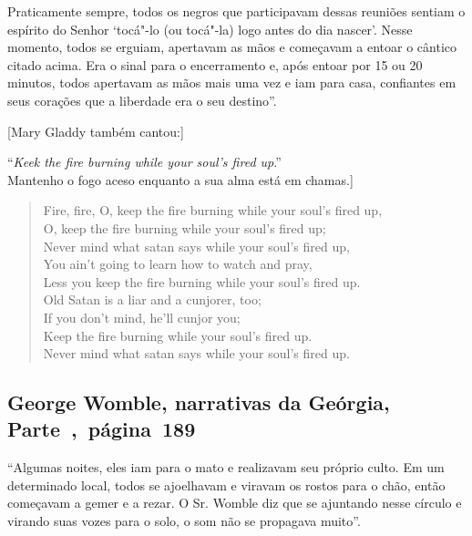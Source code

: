 Praticamente sempre, todos os negros que participavam dessas reuniões
sentiam o espírito do Senhor `tocá"-lo (ou tocá"-la) logo antes do dia
nascer'. Nesse momento, todos se erguiam, apertavam as mãos e começavam
a entoar o cântico citado acima. Era o sinal para o encerramento e, após
entoar por 15 ou 20 minutos, todos apertavam as mãos mais uma vez e iam
para casa, confiantes em seus corações que a liberdade era o seu
destino''.

{[}Mary Gladdy também cantou:{]}

\noindent{}``\emph{Keek the fire burning while your soul's fired up}.''\\
\noindent{}{[}Mantenho o fogo aceso enquanto a sua alma está em chamas.{]}

\begin{verse}
Fire, fire, O, keep the fire burning while your soul's fired up,\\
O, keep the fire burning while your soul's fired up;\\
Never mind what satan says while your soul's fired up,\\
You ain't going to learn how to watch and pray,\\
Less you keep the fire burning while your soul's fired up.\\
Old Satan is a liar and a cunjorer, too;\\
If you don't mind, he'll cunjor you;\\
Keep the fire burning while your soul's fired up.\\ 
Never mind what satan says while your soul's fired up.\footnotemark
\end{verse}

\subsection{George Womble, narrativas da Geórgia, Parte~,~página~189}
\label{ref309}

``Algumas noites, eles iam para o mato e realizavam seu próprio culto.
Em um determinado local, todos se ajoelhavam e viravam os rostos para o
chão, então começavam a gemer e a rezar. O Sr. Womble diz que se
ajuntando nesse círculo e virando suas vozes para o solo, o som não se
propagava muito''.

